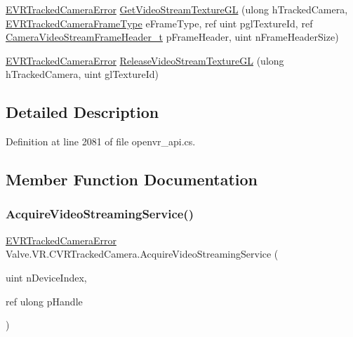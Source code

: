 \begin{DoxyCompactItemize}
\item 
\mbox{\hyperlink{namespace_valve_1_1_v_r_ad0e012e846f5d93848783c044614cfd3}{E\+V\+R\+Tracked\+Camera\+Error}} \mbox{\hyperlink{class_valve_1_1_v_r_1_1_c_v_r_tracked_camera_a9e2a9c4bee0a46c9125d0b9c6babf639}{Get\+Video\+Stream\+Texture\+GL}} (ulong h\+Tracked\+Camera, \mbox{\hyperlink{namespace_valve_1_1_v_r_a9962211bc3fe98c2683db188c12c9afd}{E\+V\+R\+Tracked\+Camera\+Frame\+Type}} e\+Frame\+Type, ref uint pgl\+Texture\+Id, ref \mbox{\hyperlink{struct_valve_1_1_v_r_1_1_camera_video_stream_frame_header__t}{Camera\+Video\+Stream\+Frame\+Header\+\_\+t}} p\+Frame\+Header, uint n\+Frame\+Header\+Size)
\item 
\mbox{\hyperlink{namespace_valve_1_1_v_r_ad0e012e846f5d93848783c044614cfd3}{E\+V\+R\+Tracked\+Camera\+Error}} \mbox{\hyperlink{class_valve_1_1_v_r_1_1_c_v_r_tracked_camera_af058ef5a3335e96a1b4510c7bc7745ad}{Release\+Video\+Stream\+Texture\+GL}} (ulong h\+Tracked\+Camera, uint gl\+Texture\+Id)
\end{DoxyCompactItemize}


\subsection{Detailed Description}


Definition at line 2081 of file openvr\+\_\+api.\+cs.



\subsection{Member Function Documentation}
\mbox{\label{class_valve_1_1_v_r_1_1_c_v_r_tracked_camera_a088e0575a1a1a133ae56608e4e244e62}} 
\subsubsection{\texorpdfstring{AcquireVideoStreamingService()}{AcquireVideoStreamingService()}}
{\footnotesize\ttfamily \mbox{\hyperlink{namespace_valve_1_1_v_r_ad0e012e846f5d93848783c044614cfd3}{E\+V\+R\+Tracked\+Camera\+Error}} Valve.\+V\+R.\+C\+V\+R\+Tracked\+Camera.\+Acquire\+Video\+Streaming\+Service (\begin{DoxyParamCaption}\item[{uint}]{n\+Device\+Index,  }\item[{ref ulong}]{p\+Handle }\end{DoxyParamCaption})}



